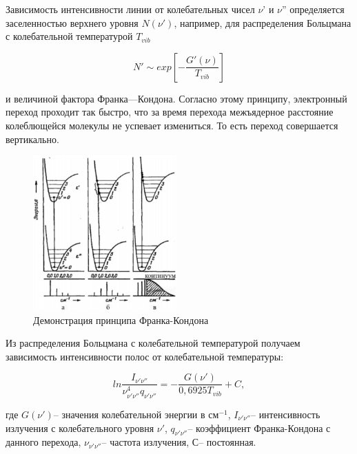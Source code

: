 Зависимость интенсивности линии от колебательных чисел $\nu$' и $\nu$'' определяется заселенностью верхнего уровня $N(\nu')$, например, для распределения Больцмана с колебательной температурой $T_{vib}$

\begin{equation}
N' \sim exp [-\frac{G'(\nu)}{T_{vib}}]
\end{equation}

и величиной фактора Франка—Кондона. Согласно этому принципу, электронный переход проходит так быстро, что за время перехода межъядерное расстояние колеблющейся молекулы не успевает измениться. То есть переход совершается вертикально.

\begin{figure}[H]
	\begin{center}
		\includegraphics[width=0.49\textwidth]{fk.png}
		\caption{Демонстрация принципа Франка-Кондона}
	\end{center}	
\end{figure}

Из распределения Больцмана с колебательной температурой получаем зависимость интенсивности полос от колебательной температуры: 

\begin{equation}
ln{\frac{I_{\nu' \nu ''}}{{\nu}_{\nu' \nu''}^4 q_{\nu' \nu''}}} = - \frac{G(\nu')}{0,6925T_{vib}} + C,
\end{equation}

где $G(\nu')$-- значения колебательной энергии в $\text{см}^{-1}$, $I_{\nu' \nu ''}$-- интенсивность излучения с колебательного уровня $\nu'$, $q_{\nu' \nu''}$-- коэффициент Франка-Кондона с данного перехода, ${\nu}_{\nu' \nu''}$-- частота излучения, С-- постоянная.

